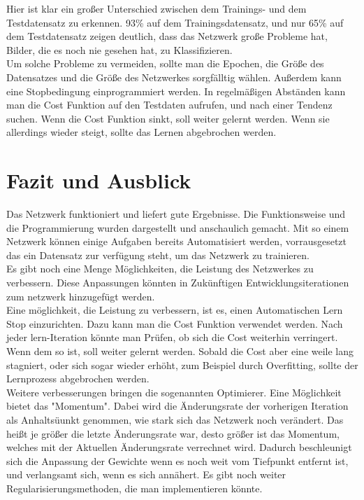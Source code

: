 \documentclass[12pt]{article}
\begin{document}
Hier ist klar ein großer Unterschied zwischen dem Trainings- und dem Testdatensatz zu erkennen. 93\% auf dem Trainingsdatensatz, und nur 65\% auf dem Testdatensatz zeigen deutlich, dass das Netzwerk große Probleme hat, Bilder, die es noch nie gesehen hat, zu Klassifizieren.\\
Um solche Probleme zu vermeiden, sollte man die Epochen, die Größe des Datensatzes und die Größe des Netzwerkes sorgfälltig wählen. Außerdem kann eine Stopbedingung einprogrammiert werden. In regelmäßigen Abständen kann man die Cost Funktion auf den Testdaten aufrufen, und nach einer Tendenz suchen. Wenn die Cost Funktion sinkt, soll weiter gelernt werden. Wenn sie allerdings wieder steigt, sollte das Lernen abgebrochen werden.

\cleardoublepage
\section{Fazit und Ausblick}
Das Netzwerk funktioniert und liefert gute Ergebnisse. Die Funktionsweise und die Programmierung wurden dargestellt und anschaulich gemacht.
Mit so einem Netzwerk können einige Aufgaben bereits Automatisiert werden, vorrausgesetzt das ein Datensatz zur verfügung steht, um das Netzwerk zu trainieren.\\
Es gibt noch eine Menge Möglichkeiten, die Leistung des Netzwerkes zu verbessern. Diese Anpassungen könnten in Zukünftigen Entwicklungsiterationen zum netzwerk hinzugefügt werden.\\
Eine möglichkeit, die Leistung zu verbessern, ist es, einen Automatischen Lern Stop einzurichten. Dazu kann man die Cost Funktion verwendet werden. Nach jeder lern-Iteration könnte man Prüfen, ob sich die Cost weiterhin verringert. Wenn dem so ist, soll weiter gelernt werden. Sobald die Cost aber eine weile lang stagniert, oder sich sogar wieder erhöht, zum Beispiel durch Overfitting, sollte der Lernprozess abgebrochen werden. \\
Weitere verbesserungen bringen die sogenannten Optimierer. Eine Möglichkeit bietet das "Momentum". Dabei wird die Änderungsrate der vorherigen Iteration als Anhaltsüunkt genommen, wie stark sich das Netzwerk noch verändert. Das heißt je größer die letzte Änderungsrate war, desto größer ist das Momentum, welches mit der Aktuellen Änderungsrate verrechnet wird. Dadurch beschleunigt sich die Anpassung der Gewichte wenn es noch weit vom Tiefpunkt entfernt ist, und verlangsamt sich, wenn es sich annähert. Es gibt noch weiter Regularisierungsmethoden, die man implementieren könnte.\\
\end{document}
